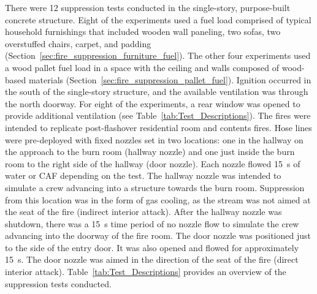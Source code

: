 \documentclass[12pt,oneside]{book}
\begin{document}
There were 12 suppression tests conducted in the single-story, purpose-built concrete structure. Eight of the experiments used a fuel load comprised of typical household furnishings that included wooden wall paneling, two sofas, two overstuffed chairs, carpet, and padding (Section~\ref{sec:fire_suppression_furniture_fuel}). The other four experiments used a wood pallet fuel load in a space with the ceiling and walls composed of wood-based materials (Section~\ref{sec:fire_suppression_pallet_fuel}). Ignition occurred in the south of the single-story structure, and the available ventilation was through the north doorway. For eight of the experiments, a rear window was opened to provide additional ventilation (see Table~\ref{tab:Test_Descriptions}). The fires were intended to replicate post-flashover residential room and contents fires. Hose lines were pre-deployed with fixed nozzles set in two locations: one in the hallway on the approach to the burn room (hallway nozzle) and one just inside the burn room to the right side of the hallway (door nozzle). Each nozzle flowed 15~s of water or CAF depending on the test. The hallway nozzle was intended to simulate a crew advancing into a structure towards the burn room. Suppression from this location was in the form of gas cooling, as the stream was not aimed at the seat of the fire (indirect interior attack).  After the hallway nozzle was shutdown, there was a 15~s time period of no nozzle flow to simulate the crew advancing into the doorway of the fire room. The door nozzle was positioned just to the side of the entry door.  It was also opened and flowed for approximately 15~s. The door nozzle was aimed in the direction of the seat of the fire (direct interior attack). Table~\ref{tab:Test_Descriptions} provides an overview of the suppression tests conducted.
\end{document}
